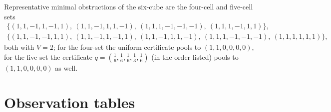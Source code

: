 \documentclass[11pt,a4paper]{article}
\makeatletter
\theoremstyle{plain}
\theoremstyle{definition}
\theoremstyle{remark}
\newcommand{\tfr}[2]{\tfrac{#1}{#2}}
\newcommand{\mref}[1]{\csname mainlab@#1\endcsname}
\makeatother
\begin{document}
\begin{table}[H]\centering\small
\caption{Obstructions: far pairs by distance with their values, admissible non-survivable sets, minimal obstructions inside the admissible family by size and value, and the largest value of any minimal obstruction (main Corollary~\mref{cor:uniform}).}\label{tab:S4obs}
\end{table}
Representative minimal obstructions of the six-cube are the four-cell and five-cell sets
\begin{gather*}
\{(1,1,-1,1,-1,1),\ (1,1,-1,1,1,-1),\ (1,1,1,-1,-1,-1),\ (1,1,1,-1,1,1)\},\\
\{(1,1,-1,-1,1,1),\ (1,1,-1,1,-1,1),\ (1,1,-1,1,1,-1),\ (1,1,1,-1,-1,-1),\ (1,1,1,1,1,1)\},
\end{gather*}
both with $V=2$; for the four-set the uniform certificate pools to $(1,1,0,0,0,0)$, for the five-set the certificate $q=(\tfr16,\tfr16,\tfr16,\tfr13,\tfr16)$ (in the order listed) pools to $(1,1,0,0,0,0)$ as well.
\section{Observation tables}\label{S:obs}
\end{document}

